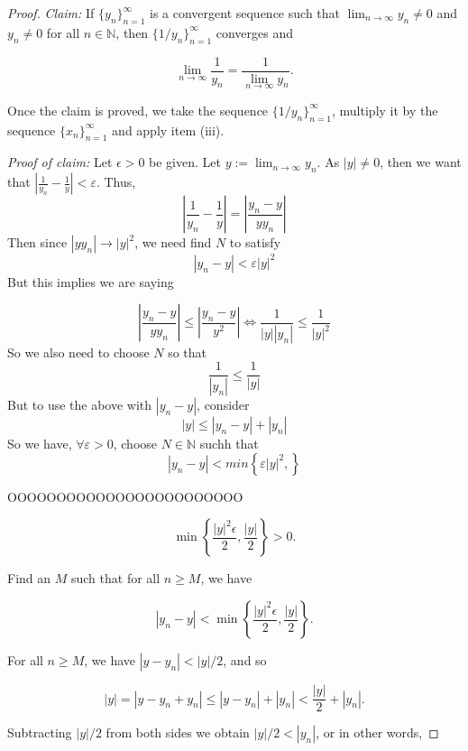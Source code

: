\documentclass[../main.tex]{subfiles}
\begin{document}
\begin{proof}
\textit{Claim:} If $\{y_n\}_{n=1}^{\infty}$ is a convergent sequence such that $\lim_{n \to \infty} y_n \neq 0$ and $y_n \neq 0$ for all $n \in \mathbb{N}$, then $\{1/y_n\}_{n=1}^{\infty}$ converges and

\[
\lim_{n \to \infty} \frac{1}{y_n} = \frac{1}{\lim_{n \to \infty} y_n}.
\]

Once the claim is proved, we take the sequence $\{1/y_n\}_{n=1}^{\infty}$, multiply it by the sequence $\{x_n\}_{n=1}^{\infty}$ and apply item (iii).

\textit{Proof of claim:} Let $\epsilon > 0$ be given. Let $y := \lim_{n \to \infty} y_n$. As $|y| \neq 0$, then
we want that $\left|\frac{1}{y_n} - \frac{1}{y}\right| < \varepsilon$.
Thus, \[
\left|\frac{1}{y_n} - \frac{1}{y}\right| = \left|\frac{y_n-y}{yy_n}\right|
\]
Then since $|yy_n| \to |y|^2$, we need find $N$ to satisfy 
\begin{equation}
    |y_n - y| < \varepsilon |y|^2
\end{equation}
But this implies we are saying

\[
    \left|\frac{y_n-y}{yy_n}\right| \leq \left|\frac{y_n-y}{y^2}\right| \iff 
     \frac{1}{|y||y_n|} \leq \frac{1}{|y|^2}
\]
So we also need to choose $N$ so that  
\[\frac{1}{|y_n|} \leq \frac{1}{|y|}\]
But to use the above with $|y_n - y|$, consider 
\[
|y| \leq |y_n - y| + |y_n|
\] 
So we have, $ \forall \varepsilon>0 $, choose $N \in \mathbb{N}$ suchh that
\[
|y_n - y | < min\left\{\varepsilon |y|^2, \right\}
\]











OOOOOOOOOOOOOOOOOOOOOOOO







\[
\min \left\{ \frac{|y|^2 \epsilon}{2}, \frac{|y|}{2} \right\} > 0.
\]

Find an $M$ such that for all $n \geq M$, we have

\[
|y_n - y| < \min \left\{ \frac{|y|^2 \epsilon}{2}, \frac{|y|}{2} \right\}.
\]

For all $n \geq M$, we have $|y - y_n| < |y|/2$, and so

\[
|y| = |y - y_n + y_n| \leq |y - y_n| + |y_n| < \frac{|y|}{2} + |y_n|.
\]

Subtracting $|y|/2$ from both sides we obtain $|y|/2 < |y_n|$, or in other words,


\end{proof}
\end{document}
